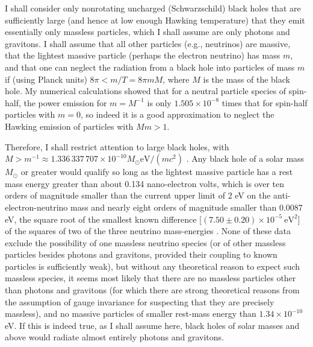 \documentclass[12pt]{article}
\begin{document}
I shall consider only nonrotating uncharged (Schwarzschild) black holes that are sufficiently large (and hence at low enough Hawking temperature) that they emit essentially only massless particles, which I shall assume are only photons and gravitons.  I shall assume that all other particles (e.g., neutrinos) are massive, that the lightest massive particle (perhaps the electron neutrino) has mass $m$, and that one can neglect the radiation from a black hole into particles of mass $m$ if (using Planck units) $8\pi < m/T = 8\pi mM$, where $M$ is the mass of the black hole.  My numerical calculations \cite{Page:1977um} showed that for a neutral particle species of spin-half, the power emission for $m = M^{-1}$ is only $1.505\times 10^{-8}$ times that for spin-half particles with $m=0$, so indeed it is a good approximation to neglect the Hawking emission of particles with $Mm > 1$.

Therefore, I shall restrict attention to large black holes, with $M > m^{-1} \approx 1.336\,337\,707\times 10^{-10} M_\odot\mathrm{eV}/(mc^2)$ \cite{Beringer:1900zz}.  Any black hole of a solar mass $M_\odot$ or greater would qualify so long as the lightest massive particle has a rest mass energy greater than about 0.134 nano-electron volts, which is over ten orders of magnitude smaller than the current upper limit of 2 eV on the anti-electron-neutrino mass \cite{Beringer:1900zz} and nearly eight orders of magnitude smaller than 0.0087 eV, the square root of the smallest known difference [$(7.50\pm 0.20)\times 10^{-5}\ \mathrm{eV}^2$] of the squares of two of the three neutrino mass-energies \cite{Beringer:1900zz}.  None of these data exclude the possibility of one massless neutrino species (or of other massless particles besides photons and gravitons, provided their coupling to known particles is sufficiently weak), but without any theoretical reason to expect such massless species, it seems most likely that there are no massless particles other than photons and gravitons (for which there are strong theoretical reasons from the assumption of gauge invariance for suspecting that they are precisely massless), and no massive particles of smaller rest-mass energy than $1.34\times 10^{-10}$ eV.  If this is indeed true, as I shall assume here, black holes of solar masses and above would radiate almost entirely photons and gravitons.
\end{document}
